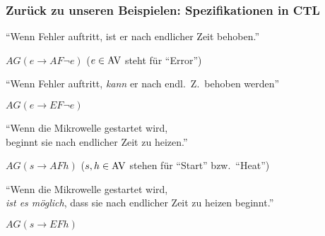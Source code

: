 \begin{frame}
  \frametitle{Zurück zu unseren Beispielen: Spezifikationen in CTL}

  \begin{Itemize}
    \item
      "`Wenn Fehler auftritt, ist er nach endlicher Zeit behoben."'
      \par\smallskip
      $AG(e \to AF \neg e)$ \hfill {\footnotesize ($e \in \textup{AV}$ steht für "`Error"')}
      \par\smallskip
    \item<2->
      "`Wenn Fehler auftritt, \emph{kann} er nach endl.\ Z.\ behoben werden"'
      \par\smallskip
      $AG(e \to EF \neg e)$
      \par\smallskip
    \item<3->
      "`Wenn die Mikrowelle gestartet wird, \\
      beginnt sie nach endlicher Zeit zu heizen."'
      \par\smallskip
      $AG(s \to AF h)$ \hfill {\footnotesize ($s,h \in \textup{AV}$ stehen für "`Start"' bzw.\ "`Heat"')}
      \par\smallskip
    \item<4->
      "`Wenn die Mikrowelle gestartet wird, \\
      \emph{ist es möglich}, dass sie nach endlicher Zeit zu heizen beginnt."'
      \par\smallskip
      $AG(s \to EF h)$
      \par\bigskip
  \end{Itemize}

  \par\medskip

\end{frame}

